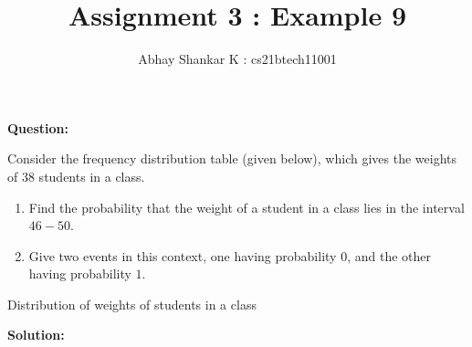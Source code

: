 \documentclass[journal,12pt,twocolumn]{IEEEtran}
\begin{document}
	\title{Assignment 3 : Example 9}
		\author{ Abhay Shankar K : cs21btech11001}

		\maketitle

		\bigskip

	\providecommand{\brak}[1]{\ensuremath{\left(#1\right)}}
	\providecommand{\sbrak}[1]{\ensuremath{\left[#1\right]}}
	\providecommand{\abs}[1]{\left\vert#1\right\vert}
	\providecommand{\norm}[1]{\left\lVert#1\right\rVert}
	\newcommand{\solution}{\noindent \textbf{Solution: }}
	\newcommand{\question}{\noindent \textbf{Question: }}

	\newcommand{\myvec}[1]{\ensuremath{\begin{pmatrix}#1\end{pmatrix}}}
	\let\vec\mathbf


	\question
	
	
	Consider the frequency distribution table (given below), which gives the weights of $38$ students in a class.
	
	\begin{enumerate}[label = \brak{\textbf{\roman*}}]
	
		\item Find the probability that the weight of a student in a class lies in the interval $46 - 50$.
		
		\item Give two events in this context, one having probability $0$, and the other having probability $1$.
		
	\end{enumerate}
	
	
	\begin{table}[!htb]
	
		\centering
		
		\caption{Distribution of weights of students in a class}
		
		
		
		\label{table : given_table}
		
	\end{table}
	
	
	\solution
	
\end{document}
